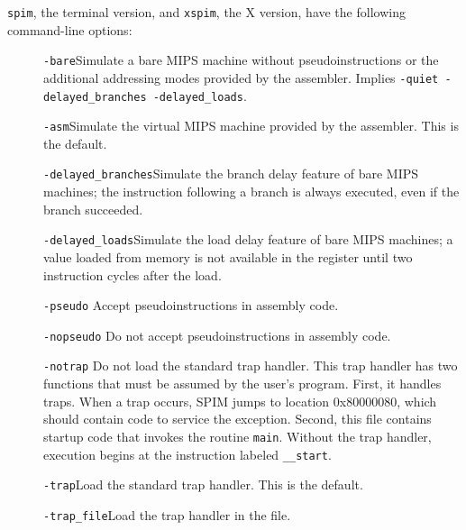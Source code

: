 \documentclass[11pt]{article}
\begin{document}
{\tt spim}, the terminal version, and {\tt xspim}, the X version, have
the following command-line options:
\begin{description}
  \item [] {\tt -bare}\newline Simulate a bare MIPS machine without
pseudoinstructions or the additional addressing modes provided by the
assembler.  Implies {\tt -quiet -delayed\_branches -delayed\_loads}.

  \item [] {\tt -asm}\newline Simulate the virtual MIPS machine
provided by the assembler.  This is the default.

  \item [] {\tt -delayed\_branches}\newline Simulate the branch delay
feature of bare MIPS machines; the instruction following a branch is
always executed, even if the branch succeeded.

  \item [] {\tt -delayed\_loads}\newline Simulate the load delay
feature of bare MIPS machines; a value loaded from memory is not
available in the register until two instruction cycles after the load.

  \item [] {\tt -pseudo} \newline Accept pseudoinstructions in assembly
code.

  \item [] {\tt -nopseudo} \newline Do not accept pseudoinstructions in
assembly code.

  \item [] {\tt -notrap} \newline Do not load the standard trap
handler.  This trap handler has two functions that must be assumed by
the user's program.  First, it handles traps.  When a trap occurs,
SPIM jumps to location 0x80000080, which should contain code to
service the exception.  Second, this file contains startup code that
invokes the routine {\tt main}.  Without the trap handler, execution
begins at the instruction labeled {\tt \_\_start}.

  \item [] {\tt -trap}\newline Load the standard trap handler.  This
is the default.

  \item [] {\tt -trap\_file}\newline Load the trap handler in the file.


\end{description}
\end{document}
